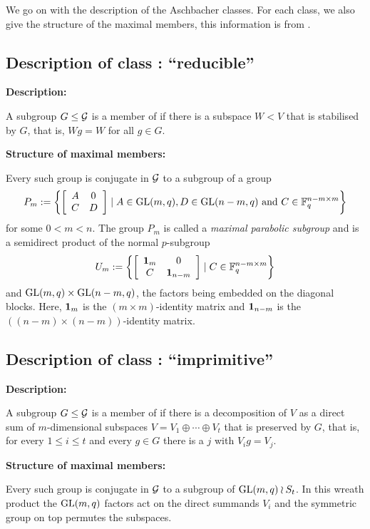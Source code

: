 We go on with the description of the Aschbacher classes. For each class, we
also give the structure of the maximal members, this information is from
\cite[Table 3.5.A]{kleilieb}.

\subsection{Description of class : ``reducible''}
\label{descC1}

\newcommand{\desc}{\textbf{Description:}\par}
\newcommand{\stru}{\textbf{Structure of maximal members:}\par}

\desc
A subgroup $G \le \mathcal{G}$ is a member of  if there is a subspace
$W < V$ that is stabilised by $G$, that is, $Wg = W$ for all $g \in G$.

\stru
Every such group is conjugate in $\mathcal{G}$ to a subgroup of a group
\[ P_m := \left\{ \left[ \begin{array}{cc} A & 0 \\ C & D \end{array} \right]
           \mid A \in \GL(m,q), D \in \GL(n-m,q) \mbox{ and }
           C \in \F_q^{n-m \times m} \right\} \]
for some $0 < m < n$. The group $P_m$ is called a \emph{maximal parabolic
subgroup} and is a semidirect product
of the normal $p$-subgroup
\[ U_m := \left\{ \left[ \begin{array}{cc} \mathbf{1}_m & 0 \\ C & \mathbf{1}_{n-m} 
           \end{array} \right]
           \mid 
           C \in \mathbb{F}_q^{n-m \times m} \right\} \]
and $\GL(m,q) \times \GL(n-m,q)$, the factors being embedded on the
diagonal blocks. 
Here, $\mathbf{1}_m$ is the $(m \times m)$-identity matrix and $\mathbf{1}_{n-m}$ is the
$((n-m) \times (n-m))$-identity matrix.

\subsection{Description of class : ``imprimitive''}
\label{descC2}

\desc
A subgroup $G \le \mathcal{G}$ is a member of  if there is a decomposition
of $V$ as a direct sum of $m$-dimensional subspaces 
$V = V_1 \oplus \cdots \oplus V_t$
that is preserved by $G$, that is, for every $1 \le i \le t$ and every 
$g \in G$ there is a $j$ with $V_i g = V_j$.

\stru
Every such group is conjugate in $\mathcal{G}$ to a subgroup of $\GL(m,q) \wr S_t$.
In this wreath product the $\GL(m,q)$ factors act on the direct summands
$V_i$ and the symmetric group on top permutes the subspaces.


